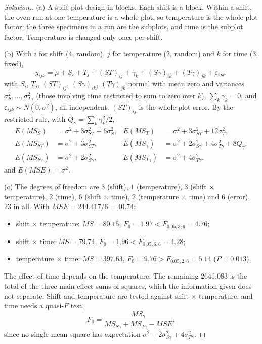 \documentclass[11pt,a4paper]{article}
\numberwithin{equation}{section}
\theoremstyle{definition}
\newenvironment{solution}
  {\renewcommand{\qedsymbol}{}\begin{proof}[\textit{Solution}.]}
  {\end{proof}}
\begin{document}
\begin{solution}
(a) A split-plot design in blocks. Each shift is a block. Within a shift, the oven run at one temperature is a whole plot, so temperature is the
whole-plot factor; the three specimens in a run are the subplots, and time is the subplot factor. Temperature is changed only once per shift.

(b) With $i$ for shift ($4$, random), $j$ for temperature ($2$, random) and $k$ for time ($3$, fixed),
\[
y_{ijk} = \mu + S_i + T_j + (ST)_{ij} + \gamma_k + (S\gamma)_{ik} + (T\gamma)_{jk} + \varepsilon_{ijk} ,
\]
with $S_i$, $T_j$, $(ST)_{ij}$, $(S\gamma)_{ik}$, $(T\gamma)_{jk}$ normal with mean zero and variances $\sigma^2_S, \dots, \sigma^2_{T\gamma}$ (those involving time restricted to sum to zero over $k$), $\sum_k\gamma_k = 0$, and
$\varepsilon_{ijk} \sim N(0, \sigma^2)$, all independent. $(ST)_{ij}$ is the whole-plot error. By the restricted rule, with $Q_\gamma = \sum_k\gamma_k^2/2$,
\begin{align*}
E(MS_S) &= \sigma^2 + 3\sigma^2_{ST} + 6\sigma^2_S , & E(MS_T) &= \sigma^2 + 3\sigma^2_{ST} + 12\sigma^2_T , \\
E(MS_{ST}) &= \sigma^2 + 3\sigma^2_{ST} , & E(MS_\gamma) &= \sigma^2 + 2\sigma^2_{S\gamma} + 4\sigma^2_{T\gamma} + 8Q_\gamma , \\
E(MS_{S\gamma}) &= \sigma^2 + 2\sigma^2_{S\gamma} , & E(MS_{T\gamma}) &= \sigma^2 + 4\sigma^2_{T\gamma} ,
\end{align*}
and $E(MSE) = \sigma^2$.

(c) The degrees of freedom are $3$ (shift), $1$ (temperature), $3$ (shift $\times$ temperature), $2$ (time), $6$ (shift $\times$ time), $2$ (temperature $\times$ time) and $6$
(error), $23$ in all. With $MSE = 244.417/6 = 40.74$:
\begin{itemize}
\item shift $\times$ temperature: $MS = 80.15$, $F_0 = 1.97 < F_{0.05, 3, 6} = 4.76$;
\item shift $\times$ time: $MS = 79.74$, $F_0 = 1.96 < F_{0.05, 6, 6} = 4.28$;
\item temperature $\times$ time: $MS = 397.63$, $F_0 = 9.76 > F_{0.05, 2, 6} = 5.14$ ($P = 0.013$).
\end{itemize}
The effect of time depends on the temperature. The remaining $2645.083$ is the total of the three main-effect sums of squares, which the
information given does not separate. Shift and temperature are tested against shift $\times$ temperature, and time needs a quasi-$F$ test,
\[
F_0 = \frac{MS_\gamma}{MS_{S\gamma} + MS_{T\gamma} - MSE} ,
\]
since no single mean square has expectation $\sigma^2 + 2\sigma^2_{S\gamma} + 4\sigma^2_{T\gamma}$.
\end{solution}
\end{document}
